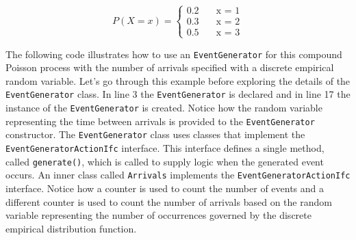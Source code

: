 \documentclass[
]{book}
\theoremstyle{definition}
\theoremstyle{definition}
\theoremstyle{definition}
\theoremstyle{definition}
\theoremstyle{remark}
\begin{document}
\[
P(X = x) =
   \begin{cases}
     0.2 & \quad \text{x = 1}\\
     0.3 & \quad \text{x = 2}\\
     0.5 & \quad \text{x = 3}
   \end{cases}
\]

The following code illustrates how to use an
\texttt{EventGenerator} for this compound Poisson process with the number of
arrivals specified with a discrete empirical random variable. Let's go
through this example before exploring the details of the \texttt{EventGenerator}
class. In line 3 the \texttt{EventGenerator} is declared and in line 17 the
instance of the \texttt{EventGenerator} is created. Notice how the random
variable representing the time between arrivals is provided to
the \texttt{EventGenerator} constructor. The \texttt{EventGenerator} class uses classes
that implement the \texttt{EventGeneratorActionIfc} interface. This interface
defines a single method, called \texttt{generate()}, which is called to supply
logic when the generated event occurs. An inner class
called \texttt{Arrivals} implements the \texttt{EventGeneratorActionIfc} interface.
Notice how a counter is used to count the number of events and a
different counter is used to count the number of arrivals based on the
random variable representing the number of occurrences governed by the
discrete empirical distribution function.
\end{document}

